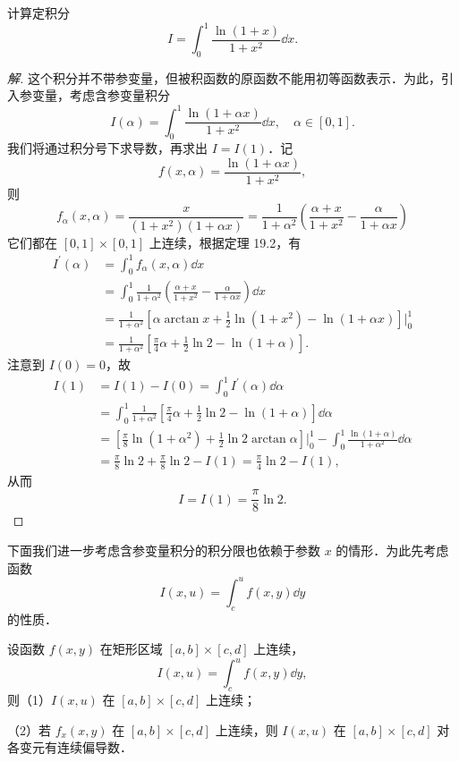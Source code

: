\begin{example}\label{ex:19-1-2}
计算定积分
\[
I=\int_{0}^{1}\frac{\ln(1+x)}{1+x^{2}}\dd x.
\]
\end{example}

\begin{proof}[解]
这个积分并不带参变量，但被积函数的原函数不能用初等函数表示．为此，引入参变量，考虑含参变量积分
\[
I(\alpha)=\int_{0}^{1}\frac{\ln(1+\alpha x)}{1+x^{2}}\dd x,\quad\alpha\in[0,1].
\]
我们将通过积分号下求导数，再求出 $I=I(1)$．记
\[
f(x,\alpha)=\frac{\ln(1+\alpha x)}{1+x^{2}},
\]
则
\[
f_{\alpha}(x,\alpha)=\frac{x}{(1+x^{2})(1+\alpha x)}=\frac{1}{1+\alpha^{2}}\left(\frac{\alpha+x}{1+x^{2}}-\frac{\alpha}{1+\alpha x}\right)
\]
它们都在 $[0,1]\times[0,1]$ 上连续，根据定理 19.2，有
\[
\begin{aligned}
I^{\prime}(\alpha)&=\int_{0}^{1}f_{\alpha}(x,\alpha)\dd x\\
&=\int_{0}^{1}\frac{1}{1+\alpha^{2}}\left(\frac{\alpha+x}{1+x^{2}}-\frac{\alpha}{1+\alpha x}\right)\dd x\\
&=\frac{1}{1+\alpha^{2}}\left[\alpha\arctan x+\frac{1}{2}\ln(1+x^{2})-\ln(1+\alpha x)\right]\bigg|_{0}^{1}\\
&=\frac{1}{1+\alpha^{2}}\left[\frac{\pi}{4}\alpha+\frac{1}{2}\ln 2-\ln(1+\alpha)\right].
\end{aligned}
\]
注意到 $I(0)=0$，故
\[
\begin{aligned}
I(1)&=I(1)-I(0)=\int_{0}^{1}I^{\prime}(\alpha)\dd\alpha\\
&=\int_{0}^{1}\frac{1}{1+\alpha^{2}}\left[\frac{\pi}{4}\alpha+\frac{1}{2}\ln 2-\ln(1+\alpha)\right]\dd\alpha\\
&=\left[\frac{\pi}{8}\ln(1+\alpha^{2})+\frac{1}{2}\ln 2\arctan\alpha\right]\bigg|_{0}^{1}-\int_{0}^{1}\frac{\ln(1+\alpha)}{1+\alpha^{2}}\dd\alpha\\
&=\frac{\pi}{8}\ln 2+\frac{\pi}{8}\ln 2-I(1)=\frac{\pi}{4}\ln 2-I(1),
\end{aligned}
\]
从而
\[
I=I(1)=\frac{\pi}{8}\ln 2.
\]
\end{proof}

下面我们进一步考虑含参变量积分的积分限也依赖于参数 $x$ 的情形．为此先考虑函数
\[
I(x,u)=\int_{c}^{u}f(x,y)\dd y
\]
的性质．

\begin{theorem}\label{thm:19-3}
设函数 $f(x,y)$ 在矩形区域 $[a,b]\times[c,d]$ 上连续，
\[
I(x,u)=\int_{c}^{u}f(x,y)\dd y,
\]
则（1）$I(x,u)$ 在 $[a,b]\times[c,d]$ 上连续；

（2）若 $f_{x}(x,y)$ 在 $[a,b]\times[c,d]$ 上连续，则 $I(x,u)$ 在 $[a,b]\times[c,d]$ 对各变元有连续偏导数．
\end{theorem}

